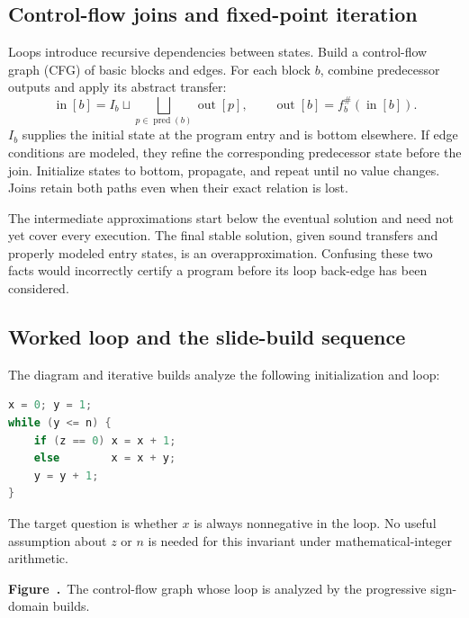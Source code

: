 \documentclass[11pt,a4paper]{article}
\numberwithin{figure}{section}
\newcommand{\diagramcaption}[1]{\par\smallskip\refstepcounter{figure}\begin{center}\small\textbf{Figure~\thefigure.}~#1\end{center}}
\begin{document}
\subsection{Control-flow joins and fixed-point iteration}
Loops introduce recursive dependencies between states. Build a control-flow graph (CFG) of basic blocks and edges. For each block $b$, combine predecessor outputs and apply its abstract transfer:
\[
\operatorname{in}[b]=I_b\sqcup\bigsqcup_{p\in\operatorname{pred}(b)}\operatorname{out}[p],
\qquad
\operatorname{out}[b]=f_b^\#(\operatorname{in}[b]).
\]
$I_b$ supplies the initial state at the program entry and is bottom elsewhere. If edge conditions are modeled, they refine the corresponding predecessor state before the join. Initialize states to bottom, propagate, and repeat until no value changes. Joins retain both paths even when their exact relation is lost.

The intermediate approximations start below the eventual solution and need not yet cover every execution. The final stable solution, given sound transfers and properly modeled entry states, is an overapproximation. Confusing these two facts would incorrectly certify a program before its loop back-edge has been considered.

\subsection{Worked loop and the slide-build sequence}
The diagram and iterative builds analyze the following initialization and loop:
\begin{lstlisting}[language=C]
x = 0; y = 1;
while (y <= n) {
    if (z == 0) x = x + 1;
    else        x = x + y;
    y = y + 1;
}
\end{lstlisting}
The target question is whether $x$ is always nonnegative in the loop. No useful assumption about $z$ or $n$ is needed for this invariant under mathematical-integer arithmetic.

\begin{center}\end{center}
\diagramcaption{The control-flow graph whose loop is analyzed by the progressive sign-domain builds.}
\end{document}
